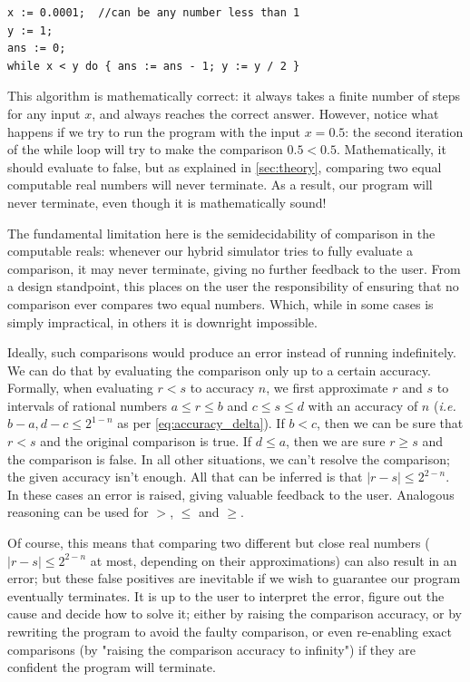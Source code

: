 \begin{lstlisting}[caption=Program that calculates the base 2 logarithm of x]
x := 0.0001;  //can be any number less than 1
y := 1;
ans := 0;
while x < y do { ans := ans - 1; y := y / 2 }
\end{lstlisting}

This algorithm is mathematically correct: it always takes a finite number of steps for any input $x$, and always reaches the correct answer. However, notice what happens if we try to run the program with the input $x=0.5$: the second iteration of the while loop will try to make the comparison $0.5 < 0.5$. Mathematically, it should evaluate to false, but as explained in \cref{sec:theory}, comparing two equal computable real numbers will never terminate. As a result, our program will never terminate, even though it is mathematically sound!

The fundamental limitation here is the semidecidability of comparison in the computable reals: whenever our hybrid simulator tries to fully evaluate a comparison, it may never terminate, giving no further feedback to the user. From a design standpoint, this places on the user the responsibility of ensuring that no comparison ever compares two equal numbers. Which, while in some cases is simply impractical, in others it is downright impossible.

Ideally, such comparisons would produce an error instead of running indefinitely. We can do that by evaluating the comparison only up to a certain accuracy. Formally, when evaluating $r<s$ to accuracy $n$, we first approximate $r$ and $s$ to intervals of rational numbers $a \leq r \leq b$ and $c \leq s \leq d$ with an accuracy of $n$ (\textit{i.e.} $b-a,d-c \leq 2^{1-n}$ as per \cref{eq:accuracy_delta}). If $b<c$, then we can be sure that $r<s$ and the original comparison is true. If $d \leq a$, then we are sure $r \geq s$ and the comparison is false. In all other situations, we can't resolve the comparison; the given accuracy isn't enough. All that can be inferred is that $|r-s| \leq 2^{2-n}$. In these cases an error is raised, giving valuable feedback to the user. Analogous reasoning can be used for $>$, $\leq$ and $\geq$.

Of course, this means that comparing two different but close real numbers ($|r-s| \leq 2^{2-n}$ at most, depending on their approximations) can also result in an error; but these false positives are inevitable if we wish to guarantee our program eventually terminates. It is up to the user to interpret the error, figure out the cause and decide how to solve it; either by raising the comparison accuracy, or by rewriting the program to avoid the faulty comparison, or even re-enabling exact comparisons (by "raising the comparison accuracy to infinity") if they are confident the program will terminate.


